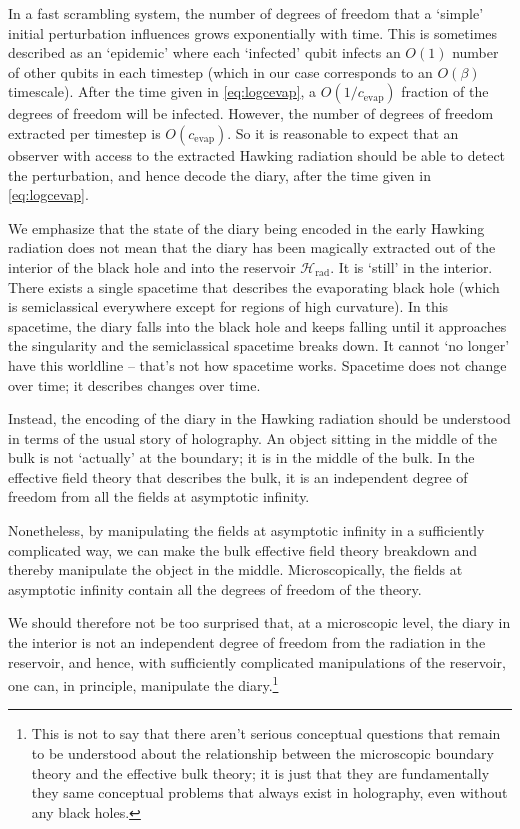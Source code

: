 \documentclass[12pt]{article}
\begin{document}
In a fast scrambling system, the number of degrees of freedom that a `simple' initial perturbation influences grows exponentially with time. This is sometimes described as an `epidemic' where each `infected' qubit infects an $O(1)$ number of other qubits in each timestep (which in our case corresponds to an $O(\beta)$ timescale). After the time given in \eqref{eq:logcevap}, a $O(1/c_\text{evap})$ fraction of the degrees of freedom will be infected. However, the number of degrees of freedom extracted per timestep is $O(c_\text{evap})$. So it is reasonable to expect that an observer with access to the extracted Hawking radiation should be able to detect the perturbation, and hence decode the diary, after the time given in \eqref{eq:logcevap}.

We emphasize that the state of the diary being encoded in the early Hawking radiation does not mean that the diary has been magically extracted out of the interior of the black hole and into the reservoir $\mathcal{H}_\text{rad}$. It is `still' in the interior. There exists a single spacetime that describes the evaporating black hole (which is semiclassical everywhere except for regions of high curvature). In this spacetime, the diary falls into the black hole and keeps falling until it approaches the singularity and the semiclassical spacetime breaks down. It cannot `no longer' have this worldline -- that's not how spacetime works. Spacetime does not change over time; it describes changes over time.

Instead, the encoding of the diary in the Hawking radiation should be understood in terms of the usual story of holography. An object sitting in the middle of the bulk is not `actually' at the boundary; it is in the middle of the bulk. In the effective field theory that describes the bulk, it is an independent degree of freedom from all the fields at asymptotic infinity. 

Nonetheless, by manipulating the fields at asymptotic infinity in a sufficiently complicated way, we can make the bulk effective field theory breakdown and thereby manipulate the object in the middle. Microscopically, the fields at asymptotic infinity contain all the degrees of freedom of the theory. 

We should therefore not be too surprised that, at a microscopic level, the diary in the interior is not an independent degree of freedom from the radiation in the reservoir, and hence, with sufficiently complicated manipulations of the reservoir, one can, in principle, manipulate the diary.\footnote{This is not to say that there aren't serious conceptual questions that remain to be understood about the relationship between the microscopic boundary theory and the effective bulk theory; it is just that they are fundamentally they same conceptual problems that always exist in holography, even without any black holes.}
\end{document}
